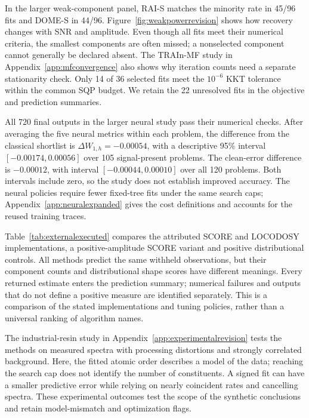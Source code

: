 In the larger weak-component panel, RAI-S matches the minority rate in 45/96 fits
and DOME-S in 44/96. Figure~\ref{fig:weakpowerrevision} shows how recovery changes
with SNR and amplitude. Even though all fits meet their numerical criteria, the
smallest components are often missed; a nonselected component cannot generally be
declared absent. The TRAIn-MF study in Appendix~\ref{app:mfconvergence} also shows
why iteration counts need a separate stationarity check. Only 14 of 36 selected
fits meet the $10^{-6}$ KKT tolerance within the common SQP budget. We retain the
22 unresolved fits in the objective and prediction summaries.

All 720 final outputs in the larger neural study pass their numerical checks.
After averaging the five neural metrics within each problem, the difference
from the classical shortlist is $\Delta W_{1,h}=-0.00054$, with a descriptive
95\% interval $[-0.00174,0.00056]$ over 105 signal-present problems. The clean-error
difference is $-0.00012$, with interval $[-0.00044,0.00010]$ over all 120 problems.
Both intervals include zero, so the study does not establish improved accuracy.
The neural policies require fewer fixed-tree fits under the same search caps;
Appendix~\ref{app:neuralexpanded} gives the cost definitions and accounts for the
reused training traces.

Table~\ref{tab:externalexecuted} compares the attributed SCORE and LOCODOSY
implementations, a positive-amplitude SCORE variant and positive distributional
controls. All methods predict the same withheld observations, but their component
counts and distributional shape scores have different meanings. Every returned
estimate enters the prediction summary; numerical failures and outputs that do
not define a positive measure are identified separately. This is a comparison of
the stated implementations and tuning policies, rather than a universal ranking
of algorithm names.

The industrial-resin study in Appendix~\ref{app:experimentalrevision} tests the
methods on measured spectra with processing distortions and strongly correlated
background. Here, the fitted atomic order describes a model of the data; reaching
the search cap does not identify the number of constituents. A signed fit can
have a smaller predictive error while relying on nearly coincident rates and
cancelling spectra. These experimental outcomes test the scope of the synthetic
conclusions and retain model-mismatch and optimization flags.

